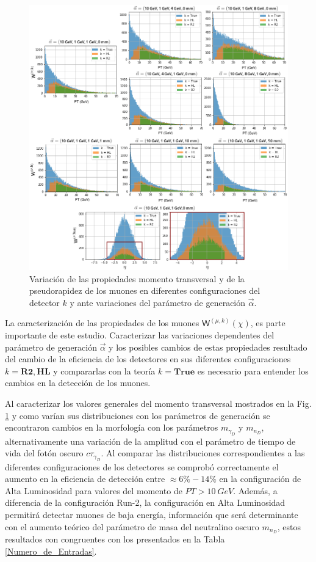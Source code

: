 \begin{figure}[!t]
\centering
\includegraphics[width=.9\textwidth]{Simulacion/imagenes/PT_comparacion.png}
\caption{Variación de las propiedades momento transversal y de la pseudorapidez de los muones en diferentes configuraciones del detector $k$ y ante variaciones del parámetro de generación $\vec{\alpha}$.}
\label{Comparacion}
\end{figure}

La caracterización de las propiedades de los muones $ \textsf{W}^{(\mu,k)} (\chi)$, es parte importante de este estudio. Caracterizar las variaciones dependentes del parámetro de generación $\vec{\alpha}$ y los posibles cambios de estas propiedades resultado del cambio de la eficiencia de los detectores en sus diferentes configuraciones $k=\mathbf{R2}, \mathbf{HL}$ y compararlas con la teoría $k=\mathbf{True}$ es necesario para entender los cambios en la detección de los muones. 

Al caracterizar los valores generales del momento transversal mostrados en la Fig. \ref{Comparacion} y como varían sus distribuciones con los parámetros de generación se encontraron cambios en la morfología con los parámetros $m_{\gamma_D}$ y $m_{n_D}$, alternativamente una variación de la amplitud con el parámetro de tiempo de vida del fotón oscuro $c\tau_{\gamma_D}$. Al comparar las distribuciones correspondientes a las diferentes configuraciones de los detectores se comprobó correctamente el aumento en la eficiencia de detección entre $\approx 6\%-14\%$ en la configuración de Alta Luminosidad para valores del momento de $PT>10 ~GeV$. Además, a diferencia de la configuración Run-2, la configuración en Alta Luminosidad permitirá detectar muones de baja energía, información que será determinante con el aumento teórico del parámetro de masa del neutralino oscuro $m_{n_D}$, estos resultados con congruentes con los presentados en la Tabla \ref{Numero_de_Entradas}.

